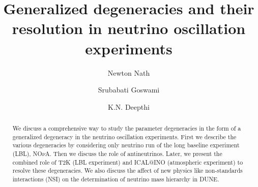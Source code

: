 \documentclass{svproc}
\begin{document}
\mainmatter              %
%
\title{Generalized degeneracies and their resolution in
neutrino oscillation experiments}
%
%
\author{Newton Nath \and Srubabati Goswami
\and K.N. Deepthi}
%
%
%

\maketitle              %
\vspace{-7mm}
\begin{abstract}
We  discuss a comprehensive way to study the parameter degeneracies in the form of a generalized degeneracy in the neutrino oscillation experiments. First we describe the various degeneracies 
by considering only neutrino run of the long baseline experiment (LBL), NO$ \nu $A. Then we discuss the role of antineutrinos. Later, we present the combined role of T2K (LBL experiment) and ICAL@INO (atmospheric experiment) to resolve these degeneracies. We also discuss the affect of  new physics like non-standards interactions (NSI) on the determination of neutrino mass hierarchy in DUNE.
%
\end{abstract}
%
\end{document}
